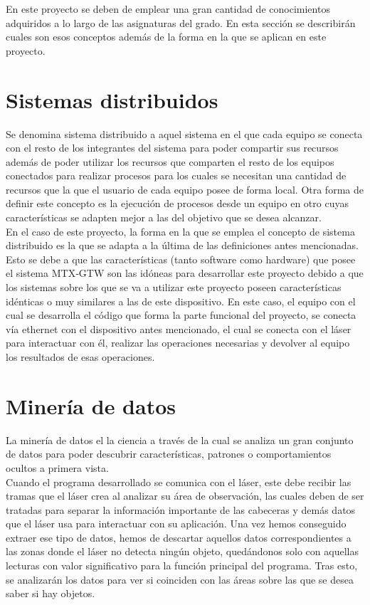 
En este proyecto se deben de emplear una gran cantidad de  conocimientos adquiridos a lo largo de las asignaturas del grado. En esta sección se describirán cuales son esos conceptos además de la forma en la que se aplican en este proyecto.

\section{Sistemas distribuidos}

Se denomina sistema distribuido a aquel sistema en el que cada equipo se conecta con el resto de los integrantes del sistema para poder compartir sus recursos además de poder utilizar los recursos que comparten el resto de los equipos conectados para realizar procesos para los cuales se necesitan una cantidad de recursos que la que el usuario de cada equipo posee de forma local. Otra forma de definir este concepto es la ejecución de procesos desde un equipo en otro cuyas características se adapten mejor a las del objetivo que se desea alcanzar.\\
En el caso de este proyecto, la forma en la que se emplea el concepto de sistema distribuido es la que se adapta a la última de las definiciones antes mencionadas. Esto se debe a que las características (tanto software como hardware) que posee el sistema MTX‐GTW son las idóneas para desarrollar este proyecto debido a que los sistemas sobre los que se va a utilizar este proyecto poseen características idénticas o muy similares a las de este dispositivo. En este caso, el equipo con el cual se desarrolla el código que forma la parte funcional del proyecto, se conecta vía ethernet con el dispositivo antes mencionado, el cual se conecta con el láser para interactuar con él, realizar las operaciones necesarias y devolver al equipo los resultados de esas operaciones.

\section{Minería de datos}

La minería de datos el la ciencia a través de la cual se analiza un gran conjunto de datos para poder descubrir características, patrones o comportamientos ocultos a primera vista.\\
Cuando el programa desarrollado se comunica con el láser, este debe recibir las tramas que el láser crea al analizar su área de observación, las cuales deben de ser tratadas para separar la información importante de las cabeceras y demás datos que el láser usa para interactuar con su aplicación. Una vez hemos conseguido extraer ese tipo de datos, hemos de descartar aquellos datos correspondientes a las zonas donde el láser no detecta ningún objeto, quedándonos solo con aquellas lecturas con valor significativo para la función principal del programa. Tras esto, se analizarán los datos para ver si coinciden con las áreas sobre las que se desea saber si hay objetos.

